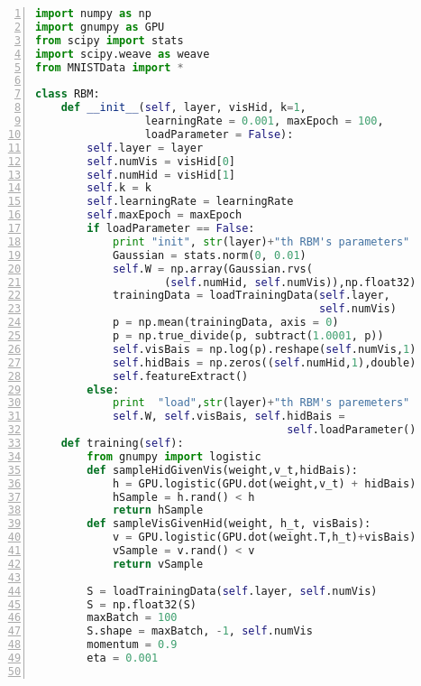 \begin{lstlisting}[language=Python,numbers=left, frame=shadowbox, rulesepcolor=\color{cadegrey}, caption=\text{RBM.py}]
import numpy as np
import gnumpy as GPU
from scipy import stats
import scipy.weave as weave
from MNISTData import *

class RBM:
    def __init__(self, layer, visHid, k=1, 
                 learningRate = 0.001, maxEpoch = 100, 
                 loadParameter = False):
        self.layer = layer
        self.numVis = visHid[0]
        self.numHid = visHid[1]
        self.k = k
        self.learningRate = learningRate
        self.maxEpoch = maxEpoch
        if loadParameter == False:
            print "init", str(layer)+"th RBM's parameters"
            Gaussian = stats.norm(0, 0.01)
            self.W = np.array(Gaussian.rvs(
                    (self.numHid, self.numVis)),np.float32)                
            trainingData = loadTrainingData(self.layer, 
                                            self.numVis)
            p = np.mean(trainingData, axis = 0)
            p = np.true_divide(p, subtract(1.0001, p))
            self.visBais = np.log(p).reshape(self.numVis,1)        
            self.hidBais = np.zeros((self.numHid,1),double)
            self.featureExtract()
        else:
            print  "load",str(layer)+"th RBM's paremeters"
            self.W, self.visBais, self.hidBais = 
                                       self.loadParameter()                   
    def training(self):
        from gnumpy import logistic
        def sampleHidGivenVis(weight,v_t,hidBais):
            h = GPU.logistic(GPU.dot(weight,v_t) + hidBais)
            hSample = h.rand() < h
            return hSample
        def sampleVisGivenHid(weight, h_t, visBais):
            v = GPU.logistic(GPU.dot(weight.T,h_t)+visBais)
            vSample = v.rand() < v
            return vSample
        
        S = loadTrainingData(self.layer, self.numVis)
        S = np.float32(S)
        maxBatch = 100
        S.shape = maxBatch, -1, self.numVis   
        momentum = 0.9
        eta = 0.001
        

\end{lstlisting}
